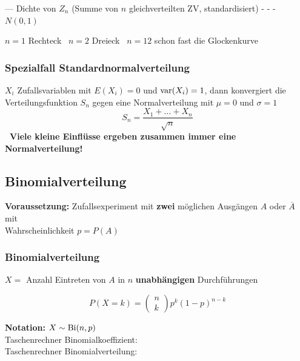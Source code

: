 \begin{center}
\begin{minipage}[t]{0.32\columnwidth}
\end{minipage}

\vspace{0.1cm}
{\scriptsize {\color{red}---} Dichte von $Z_n$ (Summe von $n$ gleichverteilten ZV, standardisiert) \quad
{\color{blue}- - -} $N(0,1)$\par
$n=1$ Rechteck \textrightarrow\ $n=2$ Dreieck \textrightarrow\ $n=12$ schon fast die Glockenkurve\par}
\end{center}


\subsubsection{Spezialfall Standardnormalverteilung}

$X_i$ Zufallsvariablen mit $E(X_i) = 0$ und $\mathrm{var}(X_i) = 1$, dann konvergiert die Verteilungsfunktion $S_n$
gegen eine Normalverteilung mit $\mu = 0$ und $\sigma = 1$
$$ S_n = \frac{X_1 + \ldots + X_n}{\sqrt{n}} $$
\textbf{\textrightarrow\ Viele kleine Einflüsse ergeben zusammen immer eine Normalverteilung!}


\subsection{Binomialverteilung}

\textbf{Voraussetzung:} Zufallsexperiment mit \textbf{zwei} möglichen Ausgängen $A$ oder $\overline{A}$ mit \\
Wahrscheinlichkeit $p = P(A)$


\subsubsection{Binomialverteilung}

$X =$ Anzahl Eintreten von $A$ in $n$ \textbf{unabhängigen} Durchführungen

$$ \boxed{ P( X = k ) = \begin{pmatrix} n \\ k \end{pmatrix} p^k (1-p)^{n-k} } $$

\textbf{Notation: } $X \sim \mathrm{Bi}(n, p)$ \\
Taschenrechner Binomialkoeffizient:  \\
Taschenrechner Binomialverteilung: 


